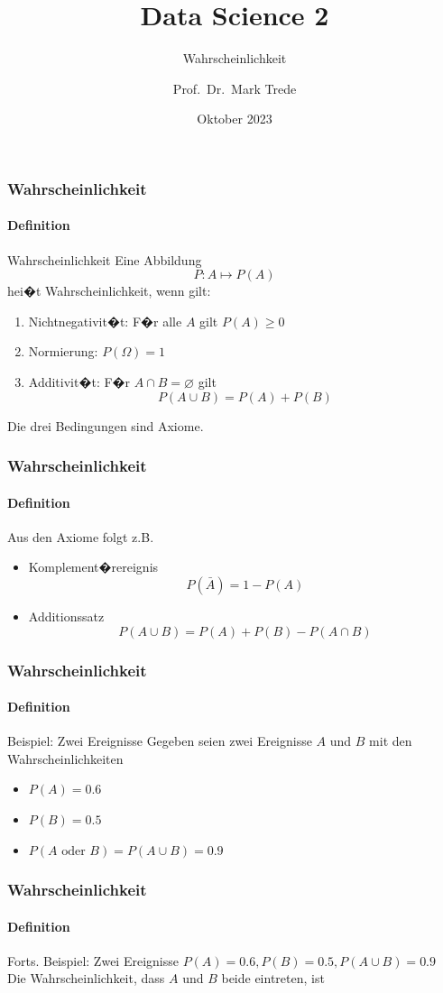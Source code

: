\documentclass[12pt,show notes]{beamer}
\begin{document}
\title{Data Science 2}
\subtitle{Wahrscheinlichkeit}
\author{Prof.~Dr.~Mark Trede}
\date{Oktober 2023}
\maketitle

\begin{frame}
\frametitle{Wahrscheinlichkeit}
\framesubtitle{Definition}
\begin{block}{Wahrscheinlichkeit}
Eine Abbildung
\[ P:A\longmapsto P(A) \]
hei�t Wahrscheinlichkeit, wenn gilt:
\begin{enumerate}
\item Nichtnegativit�t: F�r alle $A$ gilt $P(A) \geq 0$
\item Normierung: $P(\Omega)=1$
\item Additivit�t: F�r $A\cap B=\varnothing$ gilt 
\[ P(A\cup B)=P(A)+P(B) \]
\end{enumerate}
\end{block}
Die drei Bedingungen sind Axiome.
\end{frame}

\begin{frame}
\frametitle{Wahrscheinlichkeit}
\framesubtitle{Definition}
Aus den Axiome folgt z.B.\\\medskip
\begin{itemize}
\item Komplement�rereignis
\[ P(\bar{A})=1-P(A) \]
\item Additionssatz
\[ P(A\cup B)=P(A)+P(B)-P(A\cap B) \]
\end{itemize}
\end{frame}

\begin{frame}
\frametitle{Wahrscheinlichkeit}
\framesubtitle{Definition}
\begin{exampleblock}{Beispiel: Zwei Ereignisse} 
Gegeben seien zwei Ereignisse $A$ und $B$ mit den Wahrscheinlichkeiten
\begin{itemize}
\item $P(A)=0.6$
\item $P(B)=0.5$
\item $P(A\text{ oder } B)=P(A\cup B)=0.9$
\end{itemize}
\end{exampleblock}
\end{frame}

\begin{frame}
\frametitle{Wahrscheinlichkeit}
\framesubtitle{Definition}
\begin{exampleblock}{Forts. Beispiel: Zwei Ereignisse}
$P(A)=0.6, P(B)=0.5, P(A\cup B)=0.9$\\[1ex]
Die Wahrscheinlichkeit, dass $A$ und $B$ beide eintreten, ist
\end{exampleblock}
\end{frame}
\end{document}
